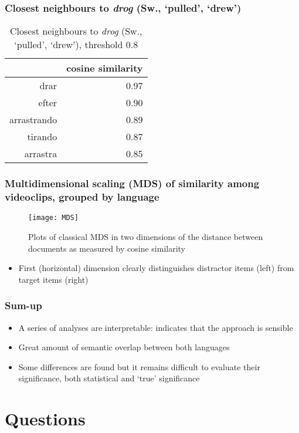 \documentclass[]{beamer}
\begin{document}
\begin{frame}
\frametitle{Closest neighbours to \emph{drog} (Sw., `pulled', `drew')}
\begin{table}[ht]
\begin{center}
\begin{tabular}{rr}
  \hline
 & cosine similarity \\ 
  \hline
drar & 0.97 \\ 
  efter & 0.90 \\ 
  arrastrando & 0.89 \\ 
  tirando & 0.87 \\ 
  arrastra & 0.85 \\ 
   \hline
\end{tabular}
\end{center}
\caption{Closest neighbours to \emph{drog} (Sw., `pulled', `drew'), threshold $0.8$}
\end{table}
\end{frame}


\begin{frame}
	\frametitle{Multidimensional scaling (MDS) of similarity among videoclips, grouped by language}
	\begin{figure}
		\centering
		\texttt{[image: MDS]}
		\caption{Plots of classical MDS in two dimensions of the distance between documents as measured by cosine similarity}
	\end{figure}
	\begin{itemize}
	\item First (horizontal) dimension clearly distinguishes distractor items (left) from target items (right)
	\end{itemize}
\end{frame}


\begin{frame}
	\frametitle{Sum-up}
	 \begin{itemize}
	 	\item A series of analyses are interpretable: indicates that the approach is sensible
	 	\item Great amount of semantic overlap between both languages
	 	\item Some differences are found but it remains difficult to evaluate their significance, both statistical and `true' significance
	 \end{itemize}
\end{frame}



\section{Questions}
\end{document}
